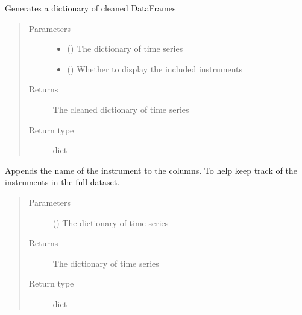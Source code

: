 \documentclass[letterpaper,10pt,english]{sphinxmanual}
\begin{document}

\begin{fulllineitems}
\label{\detokenize{preprocessing:Foresight.preprocessing.clean_dict_gen}}
Generates a dictionary of cleaned DataFrames
\begin{quote}\begin{description}
\item[{Parameters}] \leavevmode\begin{itemize}
\item {} 
 () \textendash{} The dictionary of time series

\item {} 
 () \textendash{} Whether to display the included instruments

\end{itemize}

\item[{Returns}] \leavevmode
The cleaned dictionary of time series

\item[{Return type}] \leavevmode
dict

\end{description}\end{quote}

\end{fulllineitems}


\begin{fulllineitems}
\label{\detokenize{preprocessing:Foresight.preprocessing.column_rename}}
Appends the name of the instrument to the columns.
To help keep track of the instruments in the full dataset.
\begin{quote}\begin{description}
\item[{Parameters}] \leavevmode
{} () \textendash{} The dictionary of time series

\item[{Returns}] \leavevmode
The dictionary of time series

\item[{Return type}] \leavevmode
dict

\end{description}\end{quote}

\end{fulllineitems}
\end{document}
